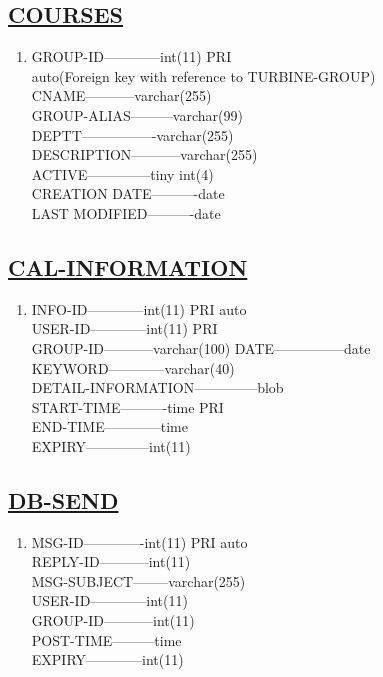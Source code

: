 \documentclass{article}
\begin{document}
\subsection*{\underline{COURSES}}
\begin{enumerate}
\item[{}{}]

GROUP-ID------------int(11)                     PRI\\
auto(Foreign key with reference to TURBINE-GROUP) \\
CNAME-----------varchar(255)\\ 
GROUP-ALIAS---------varchar(99)\\ 
DEPTT----------------varchar(255)\\ 
DESCRIPTION-----------varchar(255)\\ 
ACTIVE--------------tiny int(4)\\ 
CREATION DATE----------date\\ 
LAST MODIFIED----------date\\
\end{enumerate}
\subsection*{\underline{CAL-INFORMATION}}
\begin{enumerate}
\item[{}{}]

INFO-ID------------int(11)                  PRI             auto\\ 
USER-ID------------int(11)                  PRI \\
GROUP-ID-----------varchar(100) 
DATE---------------date\\ 
KEYWORD------------varchar(40)\\ 
DETAIL-INFORMATION--------------blob\\ 
START-TIME----------time                    PRI\\ 
END-TIME------------time\\ 
EXPIRY--------------int(11)\\
\end{enumerate}
\subsection*{\underline{DB-SEND}}
\begin{enumerate}
\item[{}{}]

MSG-ID-------------int(11)                PRI          auto \\
REPLY-ID-----------int(11) \\
MSG-SUBJECT--------varchar(255)\\ 
USER-ID------------int(11) \\
GROUP-ID-----------int(11) \\
POST-TIME---------time \\
EXPIRY------------int(11)\\ 
\end{enumerate}
\end{document}
